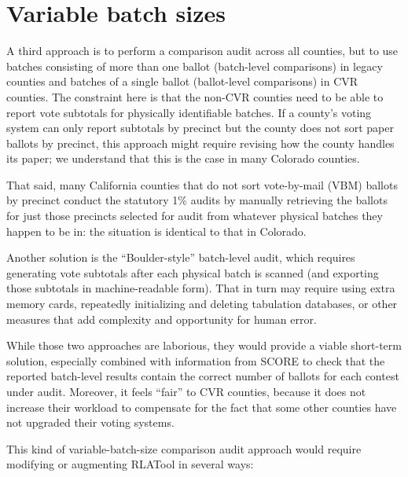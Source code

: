 \documentclass[12pt]{article}
\begin{document}
\section{Variable batch sizes}

A third approach is to perform a comparison audit across all counties, but to use batches consisting
of more than one ballot (batch-level comparisons)
in legacy counties and batches of a single ballot (ballot-level comparisons) in CVR counties.
The constraint here is that the non-CVR counties need to be able to report vote subtotals
for physically identifiable batches.
If a county's voting system can only report subtotals by precinct but 
the county does not sort paper ballots by
precinct, this approach might require revising how the county handles its
paper; we understand that this is the case in many Colorado counties.

That said, many California counties that do not sort vote-by-mail (VBM)
ballots by precinct conduct the statutory 1\% audits by manually retrieving the ballots 
for just those precincts selected for audit from whatever physical batches they happen to be in: 
the situation is identical to that in Colorado.

Another solution is the ``Boulder-style'' batch-level audit, which requires generating 
vote subtotals after each physical batch is scanned (and exporting those subtotals in machine-readable form).
That in turn may require using extra memory cards, repeatedly initializing and deleting tabulation databases,
or other measures that add complexity and opportunity for human error.

While those two approaches are laborious, they would provide a viable short-term solution,
especially combined with information from SCORE to check that the reported batch-level results contain the correct number of ballots for each contest under audit.
Moreover, it feels ``fair'' to CVR counties, because it does not increase their workload 
to compensate for the fact that some other counties have not upgraded their voting
systems.

This kind of variable-batch-size comparison audit approach would require modifying or augmenting
RLATool in several ways: 
\end{document}
